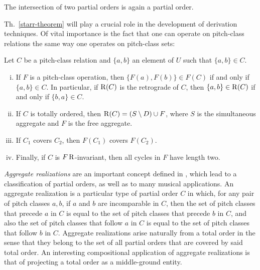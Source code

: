\begin{theorem}
    \cite[194]{Starr1984}
    The intersection of two partial orders is again a partial order.
\end{theorem}

Th.~\ref{starr-theorem} will play a crucial role in the development of derivation techniques. Of vital importance is the fact that one can operate on pitch-class relations the same way one operates on pitch-class sets:

\begin{theorem}
    \cite[195]{Starr1984}
    \label{starr-theorem-operations}
    Let $C$ be a pitch-class relation and $\{ a, b \}$ an element of $U$ such that $\{ a, b \} \in C$.
    \begin{enumerate}[i.]
        \item If $F$ is a pitch-class operation, then $\{ F(a), F(b) \} \in F(C)$ if and only if $\{ a, b \} \in C$. In particular, if $\operatorname{R}(C)$ is the retrograde of $C$, then $\{ a, b \} \in \operatorname{R}(C)$ if and only if $\{ b, a \} \in C$.
        \item If $C$ is totally ordered, then $\operatorname{R}(C) = (S \setminus D) \cup F$, where $S$ is the simultaneous aggregate and $F$ is the free aggregate.
        \item If $C_1$ covers $C_2$, then $F(C_1)$ covers $F(C_2)$.
        \item Finally, if $C$ is $F\operatorname{R}$-invariant, then all cycles in $F$ have length two.
    \end{enumerate}
\end{theorem}

\emph{Aggregate realizations} are an important concept defined in \cite[197]{Starr1984}, which lead to a classification of partial orders, as well as to many musical applications. An aggregate realization is a particular type of partial order $C$ in which, for any pair of pitch classes $a, b$, if $a$ and $b$ are incomparable in $C$, then the set of pitch classes that precede $a$ in $C$ is equal to the set of pitch classes that precede $b$ in $C$, and also the set of pitch classes that follow $a$ in $C$ is equal to the set of pitch classes that follow $b$ in $C$. Aggregate realizations arise naturally from a total order in the sense that they belong to the set of all partial orders that are covered by said total order. An interesting compositional application of aggregate realizations is that of projecting a total order as a middle-ground entity.

